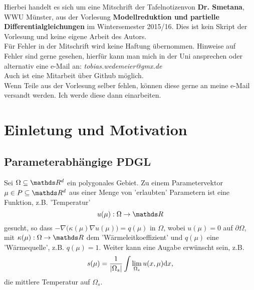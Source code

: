 

\newcommand{\vorlesung}{Modellreduktion und partielle Differentialgleichungen}
\newcommand{\Prof}{Dr. Smetana}
\newcommand{\subt}{Mitschrift der Tafelnotizen}







\maketitle
\thispagestyle{empty}
\cleardoubleoddemptypage

\thispagestyle{empty}
\vspace*{\fill}
\begin{center}
	Hierbei handelt es sich um eine \subt von \textbf{\Prof}, WWU Münster, aus der Vorlesung \textbf{\vorlesung} im Wintersemester 2015/16. 
	Dies ist kein Skript der Vorlesung und keine eigene Arbeit des Autors.\\
	\vspace{2cm}
	Für Fehler in der Mitschrift wird keine Haftung übernommen. 
	Hinweise auf Fehler sind gerne gesehen, hierfür kann man mich in der Uni ansprechen oder alternativ eine e-Mail an: \textit{tobias.wedemeier@gmx.de}\\
	Auch ist eine Mitarbeit über Github möglich.\\
	\vspace{2cm}
	Wenn Teile aus der Vorlesung selber fehlen, können diese gerne an meine e-Mail versandt werden. 
	Ich werde diese dann einarbeiten.\\
\end{center}
\vspace*{\fill}
\cleardoubleoddemptypage


\tableofcontents
\cleardoubleoddemptypage %

\section{Einletung und Motivation}

\subsection{Parameterabhängige PDGL}
\label{sub:para_pdgl}
Sei $\Omega\subseteq \R^d$ ein polygonales Gebiet. Zu einem Parametervektor $\mu \in P\subseteq \R^d$ aus einer Menge von 'erlaubten' Parametern ist eine Funktion, z.B. 'Temperatur'
\[
u(\mu): \Omega\to \R
\]
gesucht, so dass $-\nabla\big(\kappa(\mu)\nabla u(\mu)\big) = q(\mu)$ in $\Omega$, wobei $u(\mu) = 0$ auf $\partial\Omega$, mit $\kappa(\mu):\Omega\to \R$ dem 'Wärmeleitkoeffizient' und $q(\mu)$ eine 'Wärmequelle', z.B. $q(\mu)=1$.
Weiter kann eine Augabe erwünscht sein, z.B.
\[
s(\mu) = \frac{1}{\left\vert\Omega_s\right\vert} \int\lim\limits_{\Omega_s} u(x,\mu)\mathrm{d} x,
\]
die mittlere Temperatur auf $\Omega_s$.

